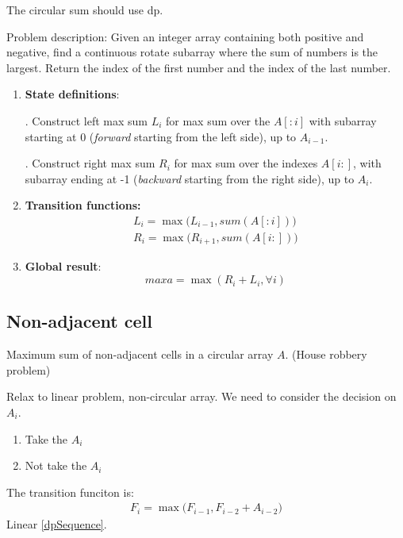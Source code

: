 The circular sum should use dp. 

Problem description: Given an integer array containing both positive and negative, find a continuous rotate subarray where the sum of numbers is the largest. Return the index of the first number and the index of the last number. 
\begin{enumerate}
\item \textbf{State definitions}: 

. Construct left max sum $L_i$ for max sum over the $A[:i]$ with subarray starting at 0 (\textit{forward} starting from the left side), up to $A_{i-1}$. 

. Construct right max sum $R_i$ for max sum over the indexes $A[i:]$, with subarray ending at -1 (\textit{backward} starting from the right side), up to $A_i$. 

\item \textbf{Transition functions:}
\begin{align*}
L_i = \max\Big(L_{i-1}, sum(A[:i])\Big) \\ 
R_i = \max\Big(R_{i+1}, sum(A[i:])\Big)
\end{align*}

\item \textbf{Global result}: 
$$maxa = \max(R_i+L_i, \forall i)$$
\end{enumerate}

\subsection{Non-adjacent cell}
Maximum sum of non-adjacent cells in a circular array $A$. (House robbery problem)

Relax to linear problem, non-circular array. We need to consider the decision on $A_i$. 
\begin{enumerate}
\item Take the $A_i$
\item Not take the $A_i$ 
\end{enumerate}
The transition funciton is:
\begin{align*}
F_{i} = \max\big(F_{i-1}, F_{i-2}+A_{i-2}\big)
\end{align*}
Linear \ref{dpSequence}. 

